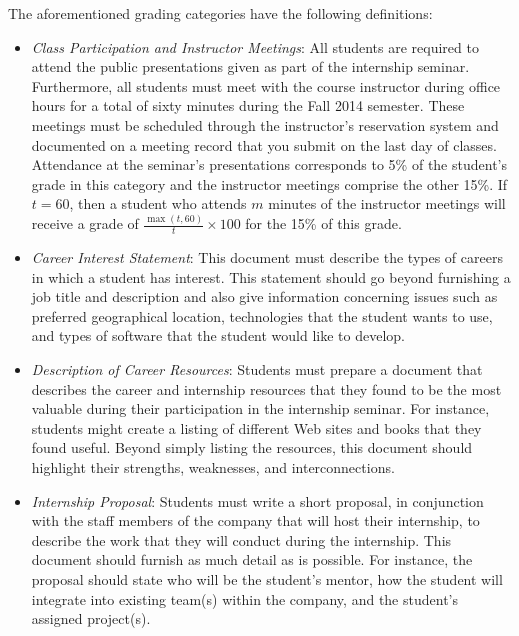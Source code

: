 \noindent
The aforementioned grading categories have the following definitions:

\begin{itemize}

  \item {\em Class Participation and Instructor Meetings}: All students are required to attend the public
    presentations given as part of the internship seminar.  Furthermore, all students must meet with the course
    instructor during office hours for a total of sixty minutes during the Fall 2014 semester.  These meetings
    must be scheduled through the instructor's reservation system and documented on a meeting record that you
    submit on the last day of classes. Attendance at the seminar's presentations corresponds to 5\% of the
    student's grade in this category and the instructor meetings comprise the other 15\%. If $t=60$, then a
    student who attends $m$ minutes of the instructor meetings will receive a grade of $\frac{\max{(t,60)}}{t}\times100$ for the
    15\% of this grade.

  \item {\em Career Interest Statement}: This document must describe the types of careers in which a student has
    interest. This statement should go beyond furnishing a job title and description and also give
    information concerning issues such as preferred geographical location, technologies that the student wants to
    use, and types of software that the student would like to develop. 	

  \item {\em Description of Career Resources}:  Students must prepare a document that describes the career and
    internship resources that they found to be the most valuable during their participation in the internship
    seminar. For instance, students might create a listing of different Web sites and books that they found useful. 
    Beyond simply listing the resources, this document should highlight their strengths, weaknesses, and interconnections. 		

  \item {\em Internship Proposal}: Students must write a short proposal, in conjunction with the staff members of the
    company that will host their internship, to describe the work that they will conduct during the internship.
    This document should furnish as much detail as is possible.  For instance, the proposal should state who will be
    the student's mentor, how the student will integrate into existing team(s) within the company, and the
    student's assigned project(s). 


\end{itemize}
